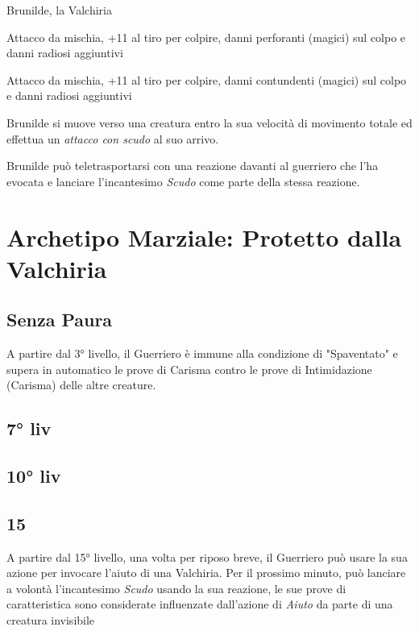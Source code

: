 \begin{DndMonster}[float*=b,width=\textwidth + 8pt]{Brunilde, la Valchiria}
\begin{multicols}{2}
    Attacco da mischia, +11 al tiro per colpire,  danni perforanti (magici) sul colpo e  danni radiosi aggiuntivi

    Attacco da mischia, +11 al tiro per colpire,  danni contundenti (magici) sul colpo e  danni radiosi aggiuntivi

    
    Brunilde si muove verso una creatura entro la sua velocità di movimento totale ed effettua un \textit{attacco con scudo} al suo arrivo.

    Brunilde può teletrasportarsi con una reazione davanti al guerriero che l'ha evocata e lanciare l'incantesimo \textit{Scudo} come parte della stessa reazione.


  \end{multicols}
\end{DndMonster}

\section{Archetipo Marziale: Protetto dalla Valchiria}

\subsection{Senza Paura}
A partire dal 3° livello, il Guerriero è immune alla condizione di "Spaventato" e supera in automatico le prove di Carisma contro le prove di Intimidazione (Carisma) delle altre creature.

\subsection{7° liv}

\subsection{10° liv}

\subsection{15}
A partire dal 15° livello, una volta per riposo breve, il Guerriero può usare la sua azione per invocare l'aiuto di una Valchiria.
Per il prossimo minuto, può lanciare a volontà l'incantesimo \textit{Scudo} usando la sua reazione, le sue prove di caratteristica sono considerate influenzate dall'azione di \textit{Aiuto} da parte di una creatura invisibile

